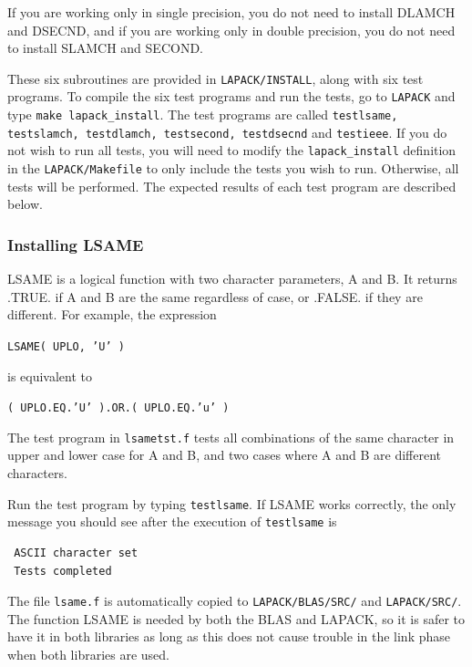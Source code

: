 \documentclass[11pt]{report}
\begin{document}
\noindent
If you are working only in single precision, you do not need to install
DLAMCH and DSECND, and if you are working only in double precision,
you do not need to install SLAMCH and SECOND.

These six subroutines are provided in \texttt{LAPACK/INSTALL},
along with six test programs.
To compile the six test programs and run the tests, go to \texttt{LAPACK} and
type \texttt{make lapack\_install}.  The test programs are called
\texttt{testlsame, testslamch, testdlamch, testsecond, testdsecnd} and
\texttt{testieee}.
If you do not wish to run all tests, you will need to modify the 
\texttt{lapack\_install} definition in the \texttt{LAPACK/Makefile} to only include the
tests you wish to run.  Otherwise, all tests will be performed.
The expected results of each test program are described below.

\subsubsection{Installing LSAME}

LSAME is a logical function with two character parameters, A and B.
It returns .TRUE. if A and B are the same regardless of case, or .FALSE.
if they are different. 
For example, the expression

\begin{list}{}{} 
\item \texttt{LSAME( UPLO, 'U' )}
\end{list}
\noindent 
is equivalent to
\begin{list}{}{} 
\item \texttt{( UPLO.EQ.'U' ).OR.( UPLO.EQ.'u' )}
\end{list} 
 
The test program in \texttt{lsametst.f} tests all combinations of
the same character in upper and lower case for A and B, and two
cases where A and B are different characters.

Run the test program by typing \texttt{testlsame}.
If LSAME works correctly, the only message you should see after the
execution of \texttt{testlsame} is
\begin{verbatim}
 ASCII character set
 Tests completed
\end{verbatim}
The file \texttt{lsame.f} is automatically copied to
\texttt{LAPACK/BLAS/SRC/} and \texttt{LAPACK/SRC/}. 
The function LSAME is needed by both the BLAS and LAPACK, so it is safer
to have it in both libraries as long as this does not cause trouble
in the link phase when both libraries are used.
\end{document}
